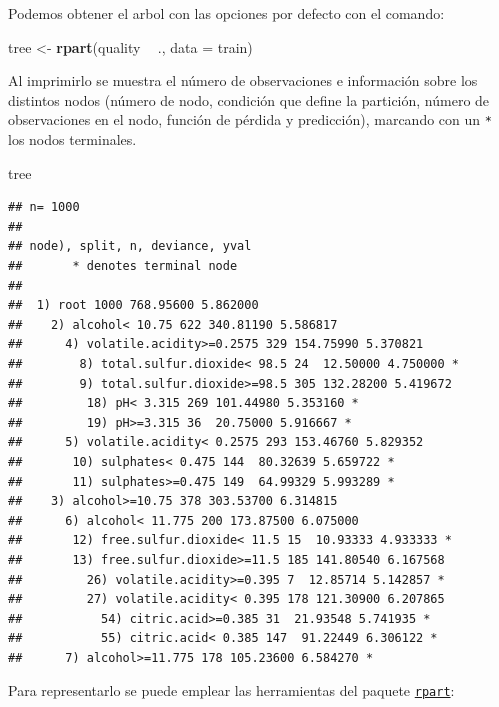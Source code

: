 \documentclass[]{book}
\newenvironment{Shaded}{\begin{snugshade}}{\end{snugshade}}
\newcommand{\KeywordTok}[1]{\textcolor[rgb]{0.13,0.29,0.53}{\textbf{#1}}}
\newcommand{\DataTypeTok}[1]{\textcolor[rgb]{0.13,0.29,0.53}{#1}}
\newcommand{\StringTok}[1]{\textcolor[rgb]{0.31,0.60,0.02}{#1}}
\newcommand{\OperatorTok}[1]{\textcolor[rgb]{0.81,0.36,0.00}{\textbf{#1}}}
\newcommand{\NormalTok}[1]{#1}
\theoremstyle{break}
\theoremstyle{definition}
\theoremstyle{definition}
\theoremstyle{definition}
\theoremstyle{remark}
\begin{document}
Podemos obtener el arbol con las opciones por defecto con el comando:

\begin{Shaded}
\begin{Highlighting}[]
\NormalTok{tree <-}\StringTok{ }\KeywordTok{rpart}\NormalTok{(quality }\OperatorTok{~}\StringTok{ }\NormalTok{., }\DataTypeTok{data =}\NormalTok{ train)}
\end{Highlighting}
\end{Shaded}

Al imprimirlo se muestra el número de observaciones e información sobre
los distintos nodos (número de nodo, condición que define la partición,
número de observaciones en el nodo, función de pérdida y predicción),
marcando con un \texttt{*} los nodos terminales.

\begin{Shaded}
\begin{Highlighting}[]
\NormalTok{tree}
\end{Highlighting}
\end{Shaded}

\begin{verbatim}
## n= 1000 
## 
## node), split, n, deviance, yval
##       * denotes terminal node
## 
##  1) root 1000 768.95600 5.862000  
##    2) alcohol< 10.75 622 340.81190 5.586817  
##      4) volatile.acidity>=0.2575 329 154.75990 5.370821  
##        8) total.sulfur.dioxide< 98.5 24  12.50000 4.750000 *
##        9) total.sulfur.dioxide>=98.5 305 132.28200 5.419672  
##         18) pH< 3.315 269 101.44980 5.353160 *
##         19) pH>=3.315 36  20.75000 5.916667 *
##      5) volatile.acidity< 0.2575 293 153.46760 5.829352  
##       10) sulphates< 0.475 144  80.32639 5.659722 *
##       11) sulphates>=0.475 149  64.99329 5.993289 *
##    3) alcohol>=10.75 378 303.53700 6.314815  
##      6) alcohol< 11.775 200 173.87500 6.075000  
##       12) free.sulfur.dioxide< 11.5 15  10.93333 4.933333 *
##       13) free.sulfur.dioxide>=11.5 185 141.80540 6.167568  
##         26) volatile.acidity>=0.395 7  12.85714 5.142857 *
##         27) volatile.acidity< 0.395 178 121.30900 6.207865  
##           54) citric.acid>=0.385 31  21.93548 5.741935 *
##           55) citric.acid< 0.385 147  91.22449 6.306122 *
##      7) alcohol>=11.775 178 105.23600 6.584270 *
\end{verbatim}

Para representarlo se puede emplear las herramientas del paquete
\href{https://CRAN.R-project.org/package=rpart}{\texttt{rpart}}:
\end{document}
